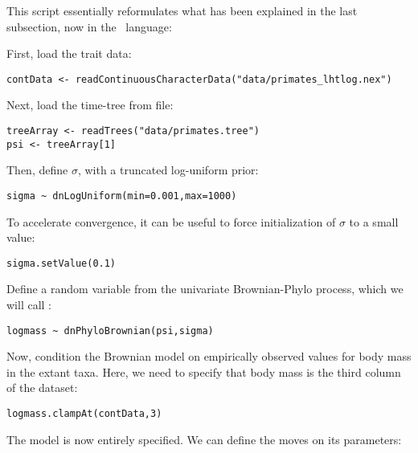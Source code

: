 This script essentially reformulates what has been explained in the last subsection, now in the \Rev~language:

First, load the trait data:
{\tt \small \begin{snugshade*}
\begin{lstlisting}
contData <- readContinuousCharacterData("data/primates_lhtlog.nex")
\end{lstlisting}
\end{snugshade*}}

Next, load the time-tree from file:
{\tt \small \begin{snugshade*}
\begin{lstlisting}
treeArray <- readTrees("data/primates.tree")
psi <- treeArray[1]
\end{lstlisting}
\end{snugshade*}}

Then, define $\sigma$, with a truncated log-uniform prior:
{\tt \small \begin{snugshade*}
\begin{lstlisting}
sigma ~ dnLogUniform(min=0.001,max=1000)
\end{lstlisting}
\end{snugshade*}}
To accelerate convergence, it can be useful to force initialization of $\sigma$ to a small value:
{\tt \small \begin{snugshade*}
\begin{lstlisting}
sigma.setValue(0.1)
\end{lstlisting}
\end{snugshade*}}

Define a random variable from the univariate Brownian-Phylo process, which we will call :
{\tt \small \begin{snugshade*}
\begin{lstlisting}
logmass ~ dnPhyloBrownian(psi,sigma)
\end{lstlisting}
\end{snugshade*}}
Now, condition the Brownian model on empirically observed values for body mass in the extant taxa.
Here, we need to specify that body mass is the third column of the dataset:
{\tt \small \begin{snugshade*}
\begin{lstlisting}
logmass.clampAt(contData,3)
\end{lstlisting}
\end{snugshade*}}

The model is now entirely specified. We can define the moves on its parameters:

